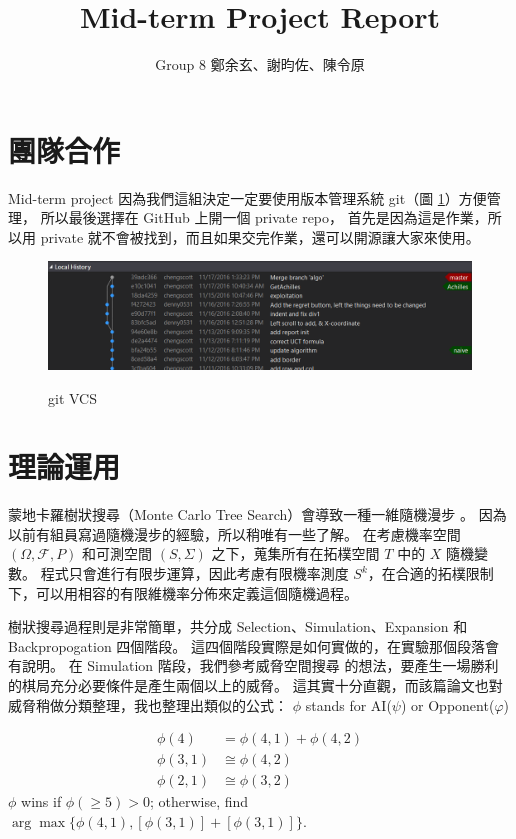 \documentclass[12pt]{article}
\begin{document}
\begin{CJK}{UTF8}{bsmi}
\title{Mid-term Project Report}
\author{Group 8 鄭余玄、謝昀佐、陳令原}
\date{}
\maketitle
\section{團隊合作}
Mid-term project 因為我們這組決定一定要使用版本管理系統 git（圖 \ref{git}）方便管理，
所以最後選擇在 GitHub 上開一個 private repo，
首先是因為這是作業，所以用 private 就不會被找到，而且如果交完作業，還可以開源讓大家來使用。

\begin{figure}[h]
  \caption{git VCS}
  \centering
  \includegraphics[width=1\textwidth]{git}
  \label{git}
\end{figure}

\section{理論運用}
蒙地卡羅樹狀搜尋（Monte Carlo Tree Search）會導致一種一維隨機漫步 \cite{MRWLTS}。
因為以前有組員寫過隨機漫步的經驗，所以稍唯有一些了解。
在考慮機率空間 $(\Omega, \mathcal{F}, P)$ 和可測空間 $(S, \Sigma)$ 之下，蒐集所有在拓樸空間 $T$ 中的 $X$ 隨機變數。
程式只會進行有限步運算，因此考慮有限機率測度 $S^k$，在合適的拓樸限制下，可以用相容的有限維機率分佈來定義這個隨機過程。

樹狀搜尋過程則是非常簡單，共分成 Selection、Simulation、Expansion 和 Backpropogation 四個階段。
這四個階段實際是如何實做的，在實驗那個段落會有說明。
在 Simulation 階段，我們參考威脅空間搜尋 \cite{threatspaces} 的想法，要產生一場勝利的棋局充分必要條件是產生兩個以上的威脅。
這其實十分直觀，而該篇論文也對威脅稍做分類整理，我也整理出類似的公式：
$\phi$ stands for AI($\psi$) or Opponent($\varphi$)

\[\begin{split}
\phi(4) &= \phi(4, 1) + \phi(4, 2)\\
\phi(3, 1)&\cong\phi(4, 2)\\
\phi(2, 1)&\cong\phi(3, 2)
\end{split}\]
$\phi$ wins if $\phi(\geq 5)>0$; otherwise, find $\arg\max\{\phi(4, 1),  [\phi(3, 1)] +  [\phi(3, 1)]\}$.


\end{CJK}
\end{document}
